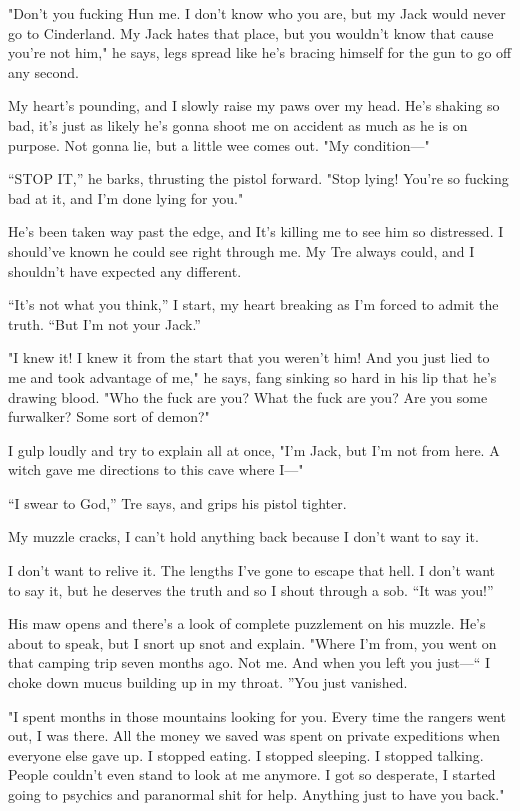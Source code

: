 "Don't you fucking Hun me. I don't know who you are, but my Jack would
never go to Cinderland. My Jack hates that place, but you wouldn't know
that cause you're not him," he says, legs spread like he's bracing
himself for the gun to go off any second.

My heart's pounding, and I slowly raise my paws over my head. He's
shaking so bad, it's just as likely he's gonna shoot me on accident as
much as he is on purpose. Not gonna lie, but a little wee comes out. "My
condition---"

``STOP IT,'' he barks, thrusting the pistol forward. "Stop lying! You're
so fucking bad at it, and I'm done lying for you."

He's been taken way past the edge, and It's killing me to see him so
distressed. I should've known he could see right through me. My Tre
always could, and I shouldn't have expected any different.

``It's not what you think,'' I start, my heart breaking as I'm forced to
admit the truth. ``But I'm not your Jack.''

"I knew it! I knew it from the start that you weren't him! And you just
lied to me and took advantage of me," he says, fang sinking so hard in
his lip that he's drawing blood. "Who the fuck are you? What the fuck
are you? Are you some furwalker? Some sort of demon?"

I gulp loudly and try to explain all at once, "I'm Jack, but I'm not
from here. A witch gave me directions to this cave where I---"

``I swear to God,'' Tre says, and grips his pistol tighter.

My muzzle cracks, I can't hold anything back because I don't want to say
it.

I don't want to relive it. The lengths I've gone to escape that hell. I
don't want to say it, but he deserves the truth and so I shout through a
sob. ``It was you!''

His maw opens and there's a look of complete puzzlement on his muzzle.
He's about to speak, but I snort up snot and explain. "Where I'm from,
you went on that camping trip seven months ago. Not me. And when you
left you just---`` I choke down mucus building up in my throat. ''You just
vanished.

"I spent months in those mountains looking for you. Every time the
rangers went out, I was there. All the money we saved was spent on
private expeditions when everyone else gave up. I stopped eating. I
stopped sleeping. I stopped talking. People couldn't even stand to look
at me anymore. I got so desperate, I started going to psychics and
paranormal shit for help. Anything just to have you back."

